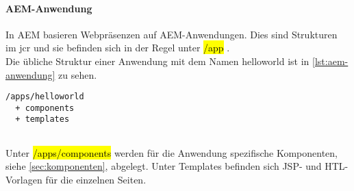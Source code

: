 \paragraph{AEM-Anwendung}

In AEM basieren Webpräsenzen auf AEM-Anwendungen. Dies sind Strukturen im \ac{jcr} und sie befinden sich in der Regel unter \hl{/app} \cite[S. 6.4]{Incorporated2015}. \\
Die übliche Struktur einer Anwendung mit dem Namen helloworld ist in \autoref{lst:aem-anwendung} zu sehen.

\begin{lstlisting}[style=jcr,caption=Exemplarische Darstellung einer AEM Anwendung, label=lst:aem-anwendung]
/apps/helloworld
  + components
  + templates
  
\end{lstlisting}

Unter \hl{/apps/components} werden für die Anwendung spezifische Komponenten, siehe \autoref{sec:komponenten}, abgelegt. Unter Templates befinden sich JSP- und HTL- Vorlagen für die einzelnen Seiten.